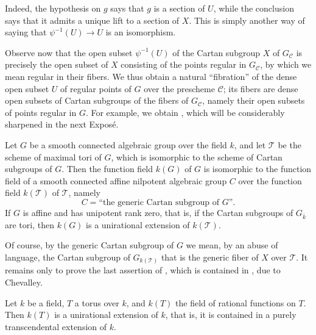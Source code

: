 Indeed, the hypothesis on \(g\) says that \(g\) is a section of
\(U\), while the conclusion says that it admits a unique lift to a
section of \(X\). This is simply another way of saying that
\(\psi^{-1}(U)\to U\) is an isomorphism.

Observe now that the open subset \(\psi^{-1}(U)\) of the Cartan
subgroup \(X\) of \(G_{\mathcal C}\) is precisely the open subset of
\(X\) consisting of the points regular in \(G_{\mathcal C}\), by
which we mean regular in their fibers. We thus obtain a natural
``fibration'' of the dense open subset \(U\) of regular points of
\(G\) over the prescheme \(\mathcal C\); its fibers are dense open
subsets of Cartan subgroups of the fibers of \(G_{\mathcal C}\),
namely their open subsets of points regular in \(G\). For example, we
obtain , which will be considerably sharpened in
the next Exposé.

\begin{corollary}
Let \(G\) be a smooth connected algebraic group over the field \(k\),
and let \(\mathcal T\) be the scheme of maximal tori of \(G\), which
is isomorphic to the scheme of Cartan subgroups of \(G\). Then the
function field \(k(G)\) of \(G\) is isomorphic to the function field
of a smooth connected affine nilpotent algebraic group \(C\) over the
function field \(k(\mathcal T)\) of \(\mathcal T\), namely
\[
  C=\text{``the generic Cartan subgroup of \(G\)''}.
\]
If \(G\) is affine and has unipotent rank zero, that is, if the Cartan
subgroups of \(G_{\overline k}\) are tori, then \(k(G)\) is a
unirational extension of \(k(\mathcal T)\).
\end{corollary}

Of course, by the generic Cartan subgroup of \(G\) we mean, by an
abuse of language, the Cartan subgroup of \(G_{k(\mathcal T)}\) that
is the generic fiber of \(X\) over \(\mathcal T\). It remains only to
prove the last assertion of , which is contained in , due to Chevalley.

\begin{lemma}
Let \(k\) be a field, \(T\) a torus over \(k\), and \(k(T)\) the
field of rational functions on \(T\). Then \(k(T)\) is a
unirational extension of \(k\), that is, it is contained in a purely
transcendental extension of \(k\).
\end{lemma}

